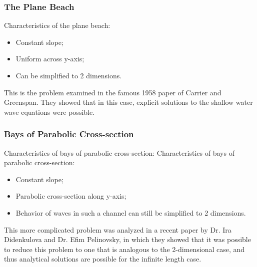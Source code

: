 	\begin{frame}
	\frametitle{The Plane Beach}
		Characteristics of the plane beach:
		\begin{itemize}
			\item Constant slope;
			\item Uniform across y-axis;
			\item Can be simplified to 2 dimensions.
		\end{itemize}
		This is the problem examined in the famous 1958 paper of Carrier and Greenspan. They showed that in this case, explicit solutions to the shallow water wave equations were possible.
	\end{frame}


	\begin{frame}
		\frametitle{Bays of Parabolic Cross-section}
		Characteristics of bays of parabolic cross-section:
		Characteristics of bays of parabolic cross-section:
		\begin{itemize}
			\item Constant slope;
			\item Parabolic cross-section along y-axis;
			\item Behavior of waves in such a channel can still be simplified to 2 dimensions.
		\end{itemize}
		This more complicated problem was analyzed in a recent paper by Dr. Ira Didenkulova and Dr. Efim Pelinovsky, in which they showed that it was possible to reduce this problem to one that is analogous to the 2-dimensional case, and thus analytical solutions are possible for the infinite length case.
	\end{frame}

